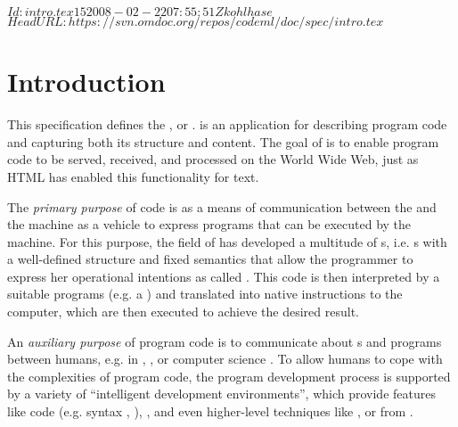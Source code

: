 \svnInfo $Id: intro.tex 15 2008-02-22 07:55:51Z kohlhase $
\svnKeyword $HeadURL: https://svn.omdoc.org/repos/codeml/doc/spec/intro.tex $
\chapter{Introduction}\label{sec:intro} 

This specification defines the {}, or {\codeml}.  {\codeml} is an
{\xml} application for describing program code and capturing both its structure and
content. The goal of {\codeml} is to enable program code to be served, received,
and processed on the World Wide Web, just as HTML has enabled this functionality
for text.
  
The {\em primary purpose} of {} code is as a
means of communication between the {} and the machine as a
vehicle to express programs that can be executed by the machine. For this purpose,
the field of {} has developed a multitude of
{s}, i.e. {s} with a well-defined structure and fixed
semantics that allow the programmer to express her operational intentions as
{} called {}. This code is then interpreted
by a suitable programs (e.g. a {}) and translated into native
instructions to the computer, which are then executed to achieve the desired
result.

An {\em auxiliary purpose} of program code is to communicate about
{s} and programs between humans, e.g. in {} {},
{}, or computer science {}. To
allow humans to cope with the complexities of program code, the program
development process is supported by a variety of ``intelligent development
environments'', which provide features like code
{} (e.g. syntax {},
{}), {}, and even higher-level
techniques like {}, or {}
{} from {}.

